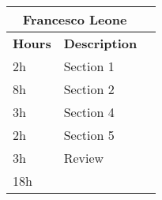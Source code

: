 \begin{table}[H]
    \centering
    \begin{tabular}{|l|l|l|}
        \multicolumn{2}{c}{\textbf{Francesco Leone}}                      \\
        \hline
        \textbf{Hours} & \textbf{Description}          \\\hline
        2h             & Section 1                                              \\\hline
        8h             & Section 2                                              \\\hline
        3h             & Section 4                                              \\\hline
        2h             & Section 5                                              \\\hline
        3h             & Review                                                 \\\hline\hline
        18h            &                                                        \\\hline
    \end{tabular}
\end{table}